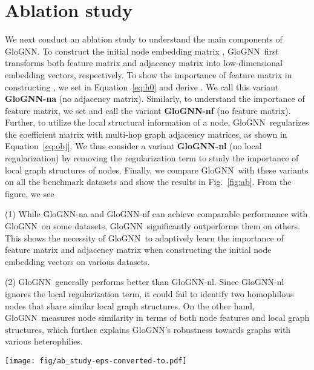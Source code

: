 \documentclass[nohyperref]{article}
\theoremstyle{plain}
\theoremstyle{definition}
\theoremstyle{remark}
\newcommand{\ada}{GloGNN}
\begin{document}
\section{Ablation study}
\label{sec:ab}
We next conduct an ablation study
to understand the main components of \ada.
To construct the initial node embedding matrix ,
\ada\ first
transforms both feature matrix and adjacency matrix into low-dimensional embedding vectors, respectively.
To show the importance of feature matrix in constructing ,
we set  in Equation~\ref{eq:h0} and derive .
We call this variant \textbf{\ada-na} (no adjacency matrix).
Similarly,
to understand the importance of feature matrix,
we set  and call the variant \textbf{\ada-nf} (no feature matrix).
Further,
to utilize the local structural information of a node,
\ada\ regularizes the coefficient matrix  with multi-hop graph adjacency matrices, as shown in Equation~\ref{eq:obj}.
We thus consider a variant \textbf{\ada-nl} (no local regularization)
by removing the regularization term to study
the importance of local graph structures of nodes.
Finally,
we compare \ada\ with these variants on all the benchmark datasets and show the results in Fig.~\ref{fig:ab}.
From the figure,
we see 

(1)
While \ada-na and \ada-nf can achieve comparable performance with \ada\ on some datasets,
\ada\ significantly outperforms them on others. 
This shows the necessity of 
\ada\ 
to adaptively learn the importance of feature matrix and adjacency matrix 
when constructing the initial node embedding vectors on various datasets.

(2)
\ada\ generally performs better than \ada-nl.
Since \ada-nl ignores the local regularization term,
it could fail to identify two homophilous nodes that share similar local graph structures.
On the other hand,
\ada\ measures node similarity in terms of both node features and local graph structures,
which further explains \ada's robustness towards graphs with various heterophilies.




\begin{figure*}[!htbp]
    \centering
        \texttt{[image: fig/ab\_study-eps-converted-to.pdf]}
        \caption{Ablation study}
        \label{fig:ab}
\end{figure*}
\end{document}
